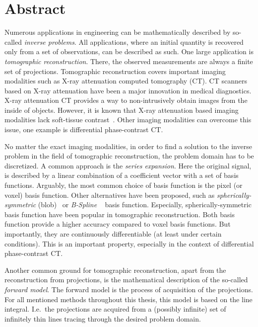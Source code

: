 \chapter*{Abstract}

\noindent%
Numerous applications in engineering can be mathematically described by so-called \textit{inverse
	problems}. All applications, where an initial quantity is recovered only from a set of observations,
can be described as such. One large application is \textit{tomographic reconstruction}. There, the
observed measurements are always a finite set of projections. Tomographic reconstruction covers
important imaging modalities such as X-ray attenuation computed tomography (CT). CT scanners based
on X-ray attenuation have been a major innovation in medical diagnostics. X-ray attenuation CT
provides a way to non-intrusively obtain images from the inside of objects. However, it is known
that X-ray attenuation based imaging modalities lack soft-tissue
contrast~\cite{pfeiffer_phase_2006}. Other imaging modalities can overcome this issue, one example
is differential phase-contrast CT\@.

No matter the exact imaging modalities, in order to find a solution to the inverse problem in the
field of tomographic reconstruction, the problem domain has to be discretized. A common approach is
the \textit{series expansion}. Here the original signal, is described by a linear combination of a
coefficient vector with a set of basis functions. Arguably, the most common choice of basis function
is the pixel (or voxel) basis function. Other alternatives have been proposed, such as
\textit{spherically-symmetric} (blob)~\cite{lewitt_multidimensional_1990} or \textit{B-Spline}
~\cite{unser_fast_1991} basis function. Especially, spherically-symmetric basis function have been
popular in tomographic reconstruction. Both basis function provide a higher accuracy compared to
voxel basis functions. But importantly, they are continuously differentiable (at least under certain
conditions). This is an important property, especially in the context of differential phase-contrast
CT\@.

Another common ground for tomographic reconstruction, apart from the reconstruction from
projections, is the mathematical description of the so-called \textit{forward model}. The forward
model is the process of acquisition of the projections. For all mentioned methods throughout this
thesis, this model is based on the line integral. I.e.\ the projections are acquired from a
(possibly infinite) set of infinitely thin lines tracing through the desired problem domain.

